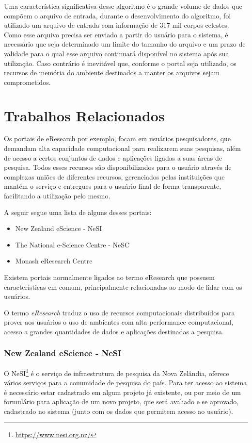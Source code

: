 \documentclass[tg]{mdtufsm}
\begin{document}
Uma característica significativa desse algoritmo é o grande volume de dados que compõem o arquivo de entrada, durante o desenvolvimento do algoritmo, foi utilizado um arquivo de entrada com informação de 317 mil corpos celestes. Como esse arquivo precisa ser enviado a partir do usuário para o sistema, é necessário que seja determinado um limite do tamanho do arquivo e um prazo de validade para o qual esse arquivo continuará disponível no sistema após sua utilização. Caso contrário é inevitável que, conforme o portal seja utilizado, os recursos de memória do ambiente destinados a manter os arquivos sejam comprometidos.

\section{Trabalhos Relacionados}

Os portais de eResearch por exemplo, focam em usuários pesquisadores, que demandam alta capacidade computacional para realizarem suas pesquisas, além de acesso a certos conjuntos de dados e aplicações ligadas a suas áreas de pesquisa. Todos esses recursos são disponibilizados para o usuário através de complexas uniões de diferentes recursos, gerenciados pelas instituições que mantém o serviço e entregues para o usuário final de forma transparente, facilitando a utilização pelo mesmo.

A seguir segue uma lista de alguns desses portais:
\begin{itemize}
	\item New Zealand eScience - NeSI
	\item The National e-Science Centre - NeSC
	\item Monash eResearch Centre
\end{itemize}

\iffalse

Existem portais normalmente ligados ao termo eResearch que possuem características em comum, principalmente relacionadas ao modo de lidar com os usuários.


O termo \emph{eResearch} traduz o uso de recursos computacionais distribuídos para prover aos usuários o uso de ambientes com alta performance computacional, acesso a grandes quantidades de dados e aplicações destinadas a pesquisa.
\subsubsection{New Zealand eScience - NeSI}
O NeSI\footnote{\url{https://www.nesi.org.nz/}} é o serviço de infraestrutura de pesquisa da Nova Zelândia, oferece vários serviços para a comunidade de pesquisa do país. Para ter acesso ao sistema é necessário estar cadastrado em algum projeto já existente, ou por meio de um formulário para aplicação de um novo projeto, que será avaliado e se aprovado, cadastrado no sistema (junto com os dados que permitem acesso ao usuário).
\end{document}
